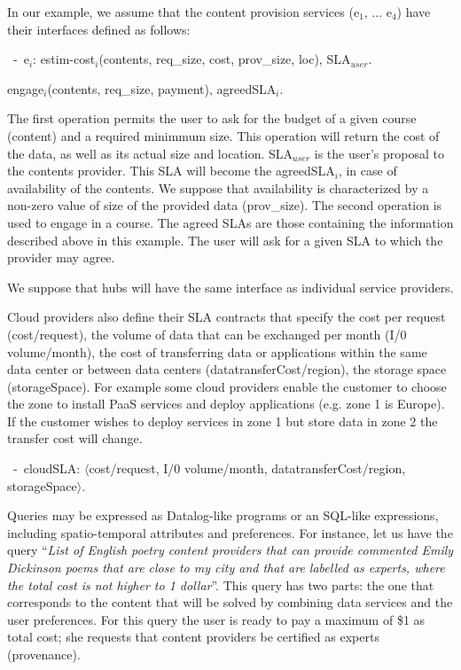 In our example, we assume that the content provision services ({\sf e$_1$, ... e$_4$}) have their interfaces defined as follows:
\begin{trivlist}\sf\footnotesize
\item[~-~e$_i$:]estim-cost$_i$(contents, req\_size, cost, prov\_size, loc), SLA$_\mathit{user}$.

                engage$_i$(contents, req\_size, payment), agreedSLA$_i$.
\end{trivlist}

The first operation permits the user to ask for the budget of a given course (content) and a required minimmum size.
This operation will return the cost of the data, as well as its actual size and location.
{\sf SLA}$_\mathit{user}$ is the user's proposal to the contents provider. 
This SLA will become the {\sf agreedSLA}$_i$, in case of availability of the contents. 
We suppose that availability is characterized by a non-zero value of size of the provided data ({\sf prov\_size}).
The second operation is used to engage in a course. 
The agreed SLAs are those containing the information described above in this example.
The user will ask for a given SLA to which the provider may agree.

We suppose that hubs will have the same interface as individual service providers.

Cloud providers also define their SLA contracts that specify the cost per request ({\sf cost/request}), the volume of data that can be exchanged per month ({\sf I/0 volume/month}), the cost of transferring data or applications within the same data center or between data centers ({\sf datatransferCost/region}), the storage space ({\sf storageSpace}). For example some cloud providers enable the customer to choose the zone to install PaaS services and deploy applications (e.g. zone 1 is Europe). If the customer wishes to deploy services in zone 1 but store data in zone 2 the transfer cost will change.

\begin{trivlist}\sf\footnotesize
 \item[~-~cloudSLA:]  $\langle$cost/request, I/0 volume/month, datatransferCost/region, storageSpace$\rangle$.
 \end{trivlist}
 

Queries may be expressed as Datalog-like programs or an SQL-like expressions, including spatio-temporal attributes and preferences.
For instance, let us have the query ``\textit{List of English poetry content providers that can provide commented Emily Dickinson poems that are close to my city and that are labelled as experts, where the total cost is not higher to 1 dollar}''. 
This query has two parts: the one that corresponds to the content that will be solved by combining data services and the user preferences. For this query the user is ready to pay a maximum of \$1 as total cost; she requests that content providers be certified as experts (provenance).

